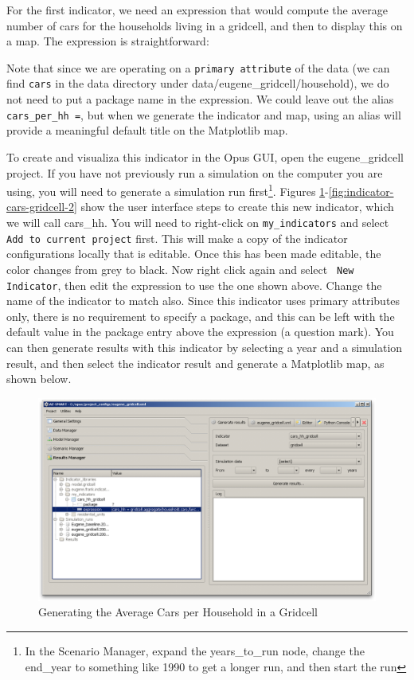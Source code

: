 For the first indicator, we need an expression that would compute the average number of cars for the households living in a gridcell, and then to display this on a map.  The expression is straightforward:


Note that since we are operating on a \verb#primary attribute# of the data (we can find \verb#cars# in the data directory under data/eugene\_gridcell/household), we do not need to put a package name in the expression.  We could leave out the alias \verb#cars_per_hh =#, but when we generate the indicator and map, using an alias will provide a meaningful default title on the Matplotlib map.

To create and visualiza this indicator in the Opus GUI, open the eugene\_gridcell project.  If you have not previously run a simulation on the computer you are using, you will need to generate a simulation run first\footnote{In the Scenario Manager, expand the years\_to\_run node, change the end\_year to something like 1990 to get a longer run, and then start the run}.   Figures \ref{fig:indicator-cars-gridcell-1}-\ref{fig:indicator-cars-gridcell-2} show the user interface steps to create this new indicator, which we will call cars\_hh.  You will need to right-click on \verb#my_indicators# and select \verb#Add to current project# first.  This will make a copy of the indicator configurations locally that is editable.  Once this has been made editable, the color changes from grey to black.  Now right click again and select \verb# New Indicator#, then edit the expression to use the one shown above.  Change the name of the indicator to match also. Since this indicator uses primary attributes only, there is no requirement to specify a package, and this can be left with the default value in the package entry above the expression (a question mark).  You can then generate results with this indicator by selecting a year and a simulation result, and then select the indicator result and generate a Matplotlib map, as shown below.

\begin{figure}[htp]
\begin{center}
\includegraphics[scale=0.4]{graphics/indicator-cars-gridcell-1.png}
\end{center}
\caption{Generating the Average Cars per Household in a Gridcell}
\label{fig:indicator-cars-gridcell-1}
\end{figure}


